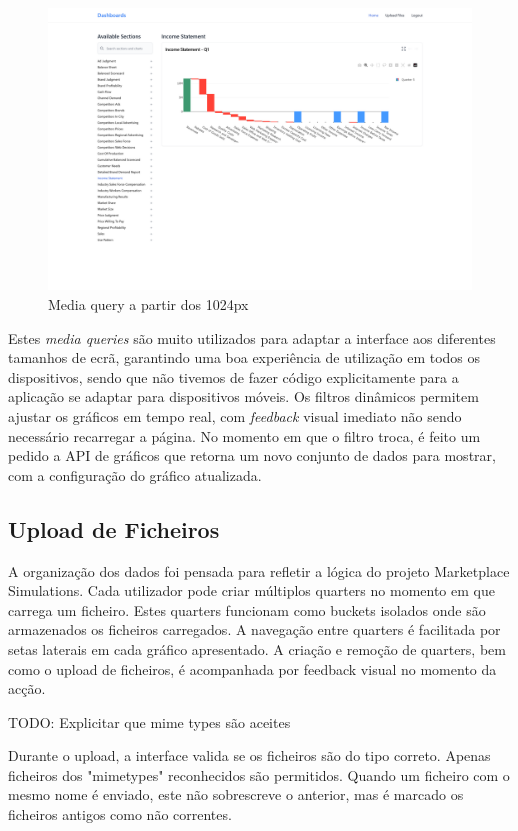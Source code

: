 \begin{figure}[H]
    \centering
    \includegraphics[width=\textwidth]{./img/res_1920}
 \caption{Media query a partir dos 1024px}
\end{figure}

Estes \textit{media queries} são muito utilizados para adaptar a interface aos diferentes tamanhos de ecrã, garantindo uma boa experiência de utilização em todos os dispositivos, sendo que não tivemos de fazer código explicitamente para a aplicação se adaptar para dispositivos móveis. Os filtros dinâmicos permitem ajustar os gráficos em tempo real, com \textit{feedback} visual imediato não sendo necessário recarregar a página. No momento em que o filtro troca, é feito um pedido a API de gráficos que retorna um novo conjunto de dados para mostrar, com a configuração do gráfico atualizada.

\subsection{Upload de Ficheiros}

A organização dos dados foi pensada para refletir a lógica do projeto Marketplace Simulations. Cada utilizador pode criar múltiplos quarters no momento em que carrega um ficheiro. Estes quarters funcionam como buckets isolados onde são armazenados os ficheiros carregados. A navegação entre quarters é facilitada por setas laterais em cada gráfico apresentado. A criação e remoção de quarters, bem como o upload de ficheiros, é acompanhada por feedback visual no momento da acção.

TODO: Explicitar que mime types são aceites

Durante o upload, a interface valida se os ficheiros são do tipo correto. Apenas ficheiros dos "mimetypes" reconhecidos são permitidos. Quando um ficheiro com o mesmo nome é enviado, este não sobrescreve o anterior,  mas é marcado os ficheiros antigos como não correntes.

